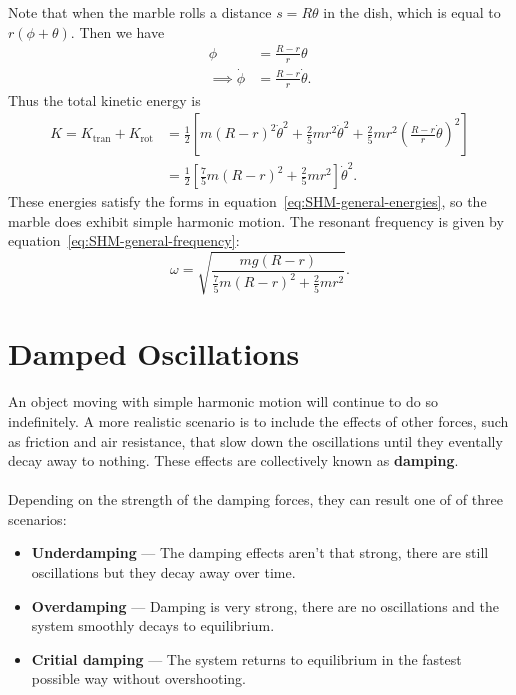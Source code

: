 \documentclass[../classical_mechanics.tex]{subfiles}
\begin{document}
\begin{example}
            Note that when the marble rolls a distance $s=R\theta$ in the dish, which is equal to $r(\phi+\theta)$.
            Then we have
            \begin{align}
                \phi&=\frac{R-r}{r}\theta\\
                \implies\dot{\phi}&=\frac{R-r}{r}\dot{\theta}.
            \end{align}
            Thus the total kinetic energy is
            \begin{align}
                K=K_\text{tran}+K_\text{rot}&=\frac{1}{2}\left[m(R-r)^2\dot{\theta}^2+\frac{2}{5}mr^2\dot{\theta}^2+\frac{2}{5}mr^2\left(\frac{R-r}{r}\dot{\theta}\right)^2\right]\\
                &=\frac{1}{2}\left[\frac{7}{5}m(R-r)^2+\frac{2}{5}mr^2\right]\dot{\theta}^2.
            \end{align}
            These energies satisfy the forms in equation~\ref{eq:SHM-general-energies}, so the marble does exhibit simple harmonic motion.
            The resonant frequency is given by equation~\ref{eq:SHM-general-frequency}:
            \begin{equation}
                \omega=\sqrt{\frac{mg(R-r)}{\frac{7}{5}m(R-r)^2+\frac{2}{5}mr^2}}.
            \end{equation}
        \end{example}

    \section{Damped Oscillations}\label{sec:damped-oscillations}
        \paragraph{}
        An object moving with simple harmonic motion will continue to do so indefinitely.
        A more realistic scenario is to include the effects of other forces, such as friction and air resistance, that slow down the oscillations until they eventally decay away to nothing.
        These effects are collectively known as \textbf{damping}.
    
        \paragraph{}
        Depending on the strength of the damping forces, they can result one of of three scenarios:
        \begin{itemize}
            \item \textbf{Underdamping} --- The damping effects aren't that strong, there are still oscillations but they decay away over time.
            \item \textbf{Overdamping} --- Damping is very strong, there are no oscillations and the system smoothly decays to equilibrium.
            \item \textbf{Critial damping} --- The system returns to equilibrium in the fastest possible way without overshooting.
        \end{itemize}
\end{document}
